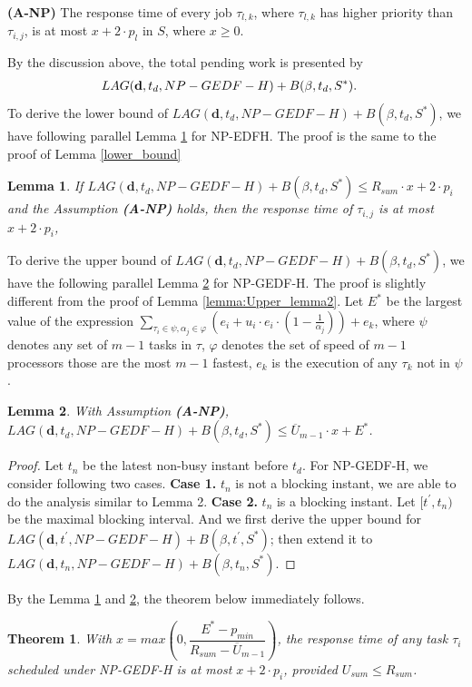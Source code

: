 \documentclass[Times, 10pt,twocolumn]{article}
\newtheorem{theorem}{\textbf{Theorem}}
\newtheorem{lemma}{\textbf{Lemma}}
\theoremstyle{definition}
\begin{document}
\textbf{(A-NP)} The response time of every job $\tau_{l,k}$, where $\tau_{l,k}$ has higher priority than $\tau_{i,j}$, is at most $x+2 \cdot p_l$ in $S$, where $x \geq 0$.

By the discussion above, the total pending work is presented by 
\begin{eqnarray*}
\label{NPLAG}\vspace{-1mm}
&LAG(\textbf{d}, t_d, {NP-GEDF-H})+B(\beta, t_d, S^{*}).
\end{eqnarray*} \vspace{-1mm}
To derive the lower bound of $LAG(\textbf{d}, t_d, {NP-GEDF-H})+B(\beta, t_d, S^{*})$, we have following parallel Lemma \ref{lemma:NP-Lower_lemma} for NP-EDFH. The proof is the same to the proof of Lemma \ref{lower_bound}

\begin{lemma}
\label{lemma:NP-Lower_lemma}
If $LAG(\textbf{d}, t_d, {NP-GEDF-H})+B(\beta, t_d, S^{*}) \leq R_{sum} \cdot x +2 \cdot p_i$ and the Assumption \textbf{(A-NP)} holds, then the response time of $\tau_{i,j}$ is at most $x + 2 \cdot p_i$,
\end{lemma}


To derive the upper bound of $LAG(\textbf{d}, t_d, {NP-GEDF-H})+B(\beta, t_d, S^{*})$, we have the following parallel Lemma \ref{lemma:NP-upper_lemma} for NP-GEDF-H. The proof is slightly different from the proof of Lemma \ref{lemma:Upper_lemma2}. Let $E^{*}$ be the largest value of the expression $ \sum_{\tau_i \in \psi ,\alpha_{j} \in \varphi}  (e_i+u_i \cdot e_i \cdot (1-\frac{1}{\alpha_j})) +e_k$, where $\psi$ denotes any set of $m-1$ tasks in $\tau$, $\varphi$ denotes the set of speed of $m-1$ processors those are the most $m-1$ fastest, $e_k$ is the execution of any $\tau_k$ not in $\psi $.

\begin{lemma}
\label{lemma:NP-upper_lemma}
With Assumption \textbf{(A-NP)}, $LAG(\textbf{d}, t_d, {NP-GEDF-H})+B(\beta, t_d, S^{*}) \leq \overline{U}_{m-1} \cdot x + E^{*}$. 
\end{lemma}
\begin{proof}
Let $t_n$ be the latest non-busy instant before $t_d$. For NP-GEDF-H, we consider following two cases. \textbf{Case 1.} $t_n$ is not a blocking instant, we are able to do the analysis similar to Lemma 2. \textbf{Case 2.} $t_n$ is a blocking instant. Let $[t^{'},t_n)$ be the maximal blocking interval. And we first derive the upper bound for $LAG(\textbf{d}, t^{'}, {NP-GEDF-H})+B(\beta, t^{'}, S^{*})$; then extend it to $LAG(\textbf{d}, t_n, {NP-GEDF-H})+B(\beta, t_n, S^{*})$.
\end{proof}


\vspace{-1mm}
By the Lemma \ref{lemma:NP-Lower_lemma} and \ref{lemma:NP-upper_lemma}, the theorem below immediately follows.
\vspace{-1mm}

\begin{theorem}
\label{theorem:NPSRTtest}
With $
 x= max( 0 , \dfrac{E^{*}-p_{min}}{R_{sum}-\overline{U}_{m-1}}) $, the response time of any task $\tau_i$ scheduled under NP-GEDF-H is at most $x + 2 \cdot p_i $, provided $U_{sum} \leq R_{sum}$.
\end{theorem}
\end{document}
